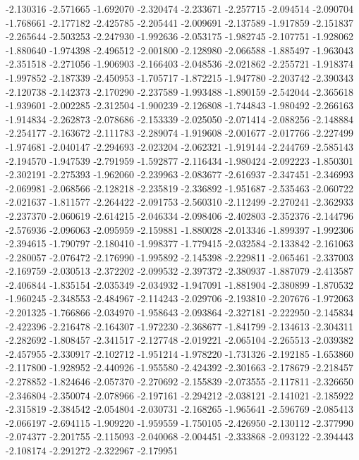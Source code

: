 -2.130316
-2.571665
-1.692070
-2.320474
-2.233671
-2.257715
-2.094514
-2.090704
-1.768661
-2.177182
-2.425785
-2.205441
-2.009691
-2.137589
-1.917859
-2.151837
-2.265644
-2.503253
-2.247930
-1.992636
-2.053175
-1.982745
-2.107751
-1.928062
-1.880640
-1.974398
-2.496512
-2.001800
-2.128980
-2.066588
-1.885497
-1.963043
-2.351518
-2.271056
-1.906903
-2.166403
-2.048536
-2.021862
-2.255721
-1.918374
-1.997852
-2.187339
-2.450953
-1.705717
-1.872215
-1.947780
-2.203742
-2.390343
-2.120738
-2.142373
-2.170290
-2.237589
-1.993488
-1.890159
-2.542044
-2.365618
-1.939601
-2.002285
-2.312504
-1.900239
-2.126808
-1.744843
-1.980492
-2.266163
-1.914834
-2.262873
-2.078686
-2.153339
-2.025050
-2.071414
-2.088256
-2.148884
-2.254177
-2.163672
-2.111783
-2.289074
-1.919608
-2.001677
-2.017766
-2.227499
-1.974681
-2.040147
-2.294693
-2.023204
-2.062321
-1.919144
-2.244769
-2.585143
-2.194570
-1.947539
-2.791959
-1.592877
-2.116434
-1.980424
-2.092223
-1.850301
-2.302191
-2.275393
-1.962060
-2.239963
-2.083677
-2.616937
-2.347451
-2.346993
-2.069981
-2.068566
-2.128218
-2.235819
-2.336892
-1.951687
-2.535463
-2.060722
-2.021637
-1.811577
-2.264422
-2.091753
-2.560310
-2.112499
-2.270241
-2.362933
-2.237370
-2.060619
-2.614215
-2.046334
-2.098406
-2.402803
-2.352376
-2.144796
-2.576936
-2.096063
-2.095959
-2.159881
-1.880028
-2.013346
-1.899397
-1.992306
-2.394615
-1.790797
-2.180410
-1.998377
-1.779415
-2.032584
-2.133842
-2.161063
-2.280057
-2.076472
-2.176990
-1.995892
-2.145398
-2.229811
-2.065461
-2.337003
-2.169759
-2.030513
-2.372202
-2.099532
-2.397372
-2.380937
-1.887079
-2.413587
-2.406844
-1.835154
-2.035349
-2.034932
-1.947091
-1.881904
-2.380899
-1.870532
-1.960245
-2.348553
-2.484967
-2.114243
-2.029706
-2.193810
-2.207676
-1.972063
-2.201325
-1.766866
-2.034970
-1.958643
-2.093864
-2.327181
-2.222950
-2.145834
-2.422396
-2.216478
-2.164307
-1.972230
-2.368677
-1.841799
-2.134613
-2.304311
-2.282692
-1.808457
-2.341517
-2.127748
-2.019221
-2.065104
-2.265513
-2.039382
-2.457955
-2.330917
-2.102712
-1.951214
-1.978220
-1.731326
-2.192185
-1.653860
-2.117800
-1.928952
-2.440926
-1.955580
-2.424392
-2.301663
-2.178679
-2.218457
-2.278852
-1.824646
-2.057370
-2.270692
-2.155839
-2.073555
-2.117811
-2.326650
-2.346804
-2.350074
-2.078966
-2.197161
-2.294212
-2.038121
-2.141021
-2.185922
-2.315819
-2.384542
-2.054804
-2.030731
-2.168265
-1.965641
-2.596769
-2.085413
-2.066197
-2.694115
-1.909220
-1.959559
-1.750105
-2.426950
-2.130112
-2.377990
-2.074377
-2.201755
-2.115093
-2.040068
-2.004451
-2.333868
-2.093122
-2.394443
-2.108174
-2.291272
-2.322967
-2.179951
